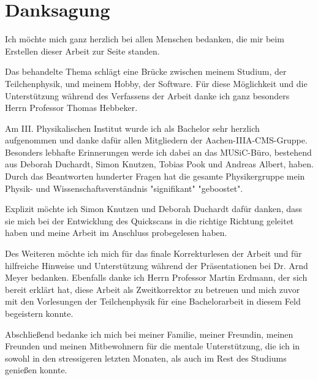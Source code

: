 
\chapter*{Danksagung}
Ich möchte mich ganz herzlich bei allen Menschen bedanken, die mir beim Erstellen dieser Arbeit zur Seite standen. 

Das behandelte Thema schlägt eine Brücke zwischen meinem Studium, der Teilchenphysik, und meinem Hobby, der Software. Für diese Möglichkeit und die Unterstützung während des Verfassens der Arbeit danke ich ganz besonders Herrn Professor Thomas Hebbeker.

Am III. Physikalischen Institut wurde ich als Bachelor sehr herzlich aufgenommen und danke dafür allen Mitgliedern der Aachen-IIIA-CMS-Gruppe. Besonders lebhafte Erinnerungen werde ich dabei an das MUSiC-Büro, bestehend aus Deborah Duchardt, Simon Knutzen, Tobias Pook und Andreas Albert, haben. Durch das Beantworten hunderter Fragen hat die gesamte Physikergruppe mein Physik- und Wissenschaftsverständnis "signifikant" "geboostet".

Explizit möchte ich Simon Knutzen und Deborah Duchardt dafür danken, dass sie mich bei der Entwicklung des Quickscans in die richtige Richtung geleitet haben und meine Arbeit im Anschluss probegelesen haben.

Des Weiteren möchte ich mich für das finale Korrekturlesen der Arbeit und für hilfreiche Hinweise und Unterstützung während der Präsentationen bei Dr. Arnd Meyer bedanken. Ebenfalls danke ich Herrn Professor Martin Erdmann, der sich bereit erklärt hat, diese Arbeit als Zweitkorrektor zu betreuen und mich zuvor mit den Vorlesungen der Teilchenphysik für eine Bachelorarbeit in diesem Feld begeistern konnte.

Abschließend bedanke ich mich bei meiner Familie, meiner Freundin, meinen Freunden und meinen Mitbewohnern für die mentale Unterstützung, die ich in sowohl in den stressigeren letzten Monaten, als auch im Rest des Studiums genießen konnte.

